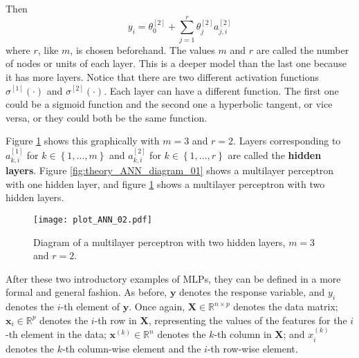 Then
\begin{equation}
  y_i = \theta_0^{[2]} + \sum_{j = 1}^r \theta_j^{[2]} a_{j,i}^{[2]}
\end{equation}
where $r$, like $m$, is chosen beforehand. The values $m$ and $r$ are called the number of nodes or units of each layer. This is a deeper model than the last one because it has more layers. Notice that there are two different activation functions $\sigma^{[1]}(\cdot)$ and $\sigma^{[2]}(\cdot)$. Each layer can have a different function. The first one could be a sigmoid function and the second one a hyperbolic tangent, or vice versa, or they could both be the same function.

Figure \ref{fig:theory_ANN_diagram_02} shows this graphically with $m = 3$ and $r = 2$. Layers corresponding to $a_{k,i}^{[1]}$ for $k \in \left\{ 1, \ldots, m \right\}$ and $a_{k,i}^{[2]}$ for $k \in \left\{ 1, \ldots, r \right\}$ are called the \textbf{hidden layers}.
Figure \ref{fig:theory_ANN_diagram_01} shows a multilayer perceptron with one hidden layer, and figure \ref{fig:theory_ANN_diagram_02} shows a multilayer perceptron with two hidden layers.

\begin{figure}[H]
    \centering
    \texttt{[image: plot\_ANN\_02.pdf]}
    \caption{Diagram of a multilayer perceptron with two hidden layers, $m = 3$ and $r = 2$.}
    \label{fig:theory_ANN_diagram_02}
\end{figure}

After these two introductory examples of MLPs, they can be defined in a more formal and general fashion.
As before, $\boldsymbol{y}$ denotes the response variable, and $y_i$ denotes the $i$-th element of $\boldsymbol{y}$.
Once again, $\boldsymbol{X} \in \mathbb{R}^{n \times p}$ denotes the data matrix; $\boldsymbol{x}_i \in \mathbb{R}^p$ denotes the $i$-th row in $\boldsymbol{X}$, representing the values of the features for the $i$-th element in the data; $\boldsymbol{x}^{(k)} \in \mathbb{R}^n$ denotes the $k$-th column in $\boldsymbol{X}$; and $x_i^{(k)}$ denotes the $k$-th column-wise element and the $i$-th row-wise element.

